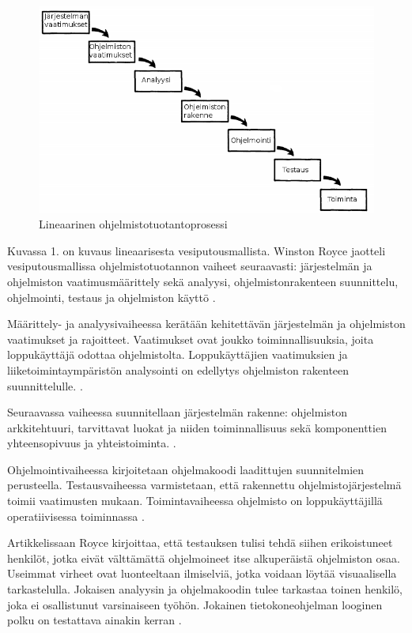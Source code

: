 \documentclass[finnish]{tktltiki2}
\theoremstyle{definition}
\theoremstyle{remark}
\begin{document}
\begin{figure}[h!]
  \caption{Lineaarinen ohjelmistotuotantoprosessi}
  \centering
    \includegraphics[width=\textwidth]{waterfall}
\end{figure}

Kuvassa 1. on kuvaus lineaarisesta vesiputousmallista. Winston Royce jaotteli vesiputousmallissa ohjelmistotuotannon vaiheet seuraavasti: järjestelmän ja ohjelmiston vaatimusmäärittely sekä analyysi, ohjelmistonrakenteen suunnittelu, ohjelmointi, testaus ja ohjelmiston käyttö \cite{ROY70}.

Määrittely- ja analyysivaiheessa kerätään kehitettävän järjestelmän ja ohjelmiston vaatimukset ja rajoitteet. Vaatimukset ovat joukko toiminnallisuuksia, joita loppukäyttäjä odottaa ohjelmistolta. Loppukäyttäjien vaatimuksien ja liiketoimintaympäristön analysointi on edellytys ohjelmiston rakenteen suunnittelulle. \cite{ROY70}.

Seuraavassa vaiheessa suunnitellaan järjestelmän rakenne: ohjelmiston arkkitehtuuri, tarvittavat luokat ja niiden toiminnallisuus sekä komponenttien yhteensopivuus ja yhteistoiminta. \cite{ROY70}.

Ohjelmointivaiheessa kirjoitetaan ohjelmakoodi laadittujen suunnitelmien perusteella. Testausvaiheessa varmistetaan, että rakennettu ohjelmistojärjestelmä toimii vaatimusten mukaan. Toimintavaiheessa ohjelmisto on loppukäyttäjillä operatiivisessa toiminnassa \cite{ROY70}. 

Artikkelissaan Royce kirjoittaa, että testauksen tulisi tehdä siihen erikoistuneet henkilöt, jotka eivät välttämättä ohjelmoineet itse alkuperäistä ohjelmiston osaa. Useimmat virheet ovat luonteeltaan ilmiselviä, jotka voidaan löytää visuaalisella tarkastelulla. Jokaisen analyysin ja ohjelmakoodin tulee tarkastaa toinen henkilö, joka ei osallistunut varsinaiseen työhön. Jokainen tietokoneohjelman looginen polku on testattava ainakin kerran \cite{ROY70}.
\end{document}
